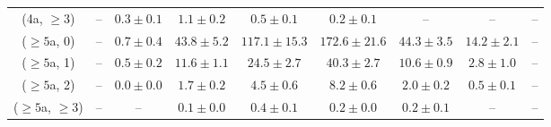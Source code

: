 \begin{table}[h!]
{\begin{tabular}{ccccccccc}
	(4a, $\ge3$) & -- & $0.3\pm 0.1$ & $1.1\pm 0.2$ & $0.5\pm 0.1$ & $0.2\pm 0.1$ & -- & -- & -- \\[0.5ex] 
	($\ge5$a, 0) & -- & $0.7\pm 0.4$ & $43.8\pm 5.2$ & $117.1\pm 15.3$ & $172.6\pm 21.6$ & $44.3\pm 3.5$ & $14.2\pm 2.1$ & -- \\[0.5ex] 
	($\ge5$a, 1) & -- & $0.5\pm 0.2$ & $11.6\pm 1.1$ & $24.5\pm 2.7$ & $40.3\pm 2.7$ & $10.6\pm 0.9$ & $2.8\pm 1.0$ & -- \\[0.5ex] 
	($\ge5$a, 2) & -- & $0.0\pm 0.0$ & $1.7\pm 0.2$ & $4.5\pm 0.6$ & $8.2\pm 0.6$ & $2.0\pm 0.2$ & $0.5\pm 0.1$ & -- \\[0.5ex] 
	($\ge5$a, $\ge3$) & -- & -- & $0.1\pm 0.0$ & $0.4\pm 0.1$ & $0.2\pm 0.0$ & $0.2\pm 0.1$ & -- & -- \\[0.5ex] 
	\hline
	\hline
\end{tabular}}
\end{table}
